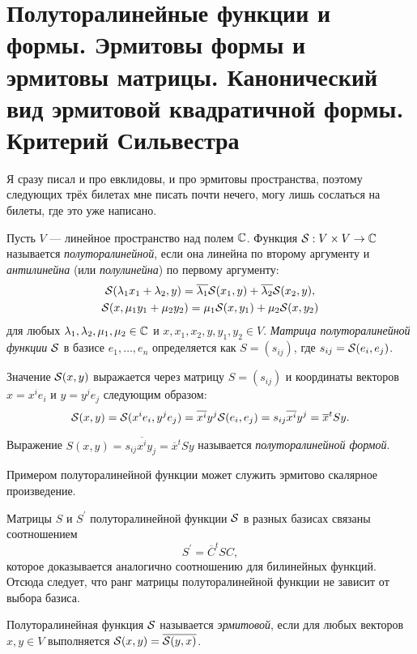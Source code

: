 \section{Полуторалинейные функции и формы. Эрмитовы формы и эрмитовы матрицы.
Канонический вид эрмитовой квадратичной формы. Критерий Сильвестра}

Я сразу писал и про евклидовы, и про эрмитовы пространства, поэтому следующих трёх билетах мне писать почти нечего, могу лишь сослаться на билеты, где это уже написано.

\begin{definition}
    Пусть $V$ --- линейное пространство над полем $\C$. Функция $\S: V \times V \to \C$ называется \textit{полуторалинейной}, если она линейна по второму аргументу и \textit{антилинейна} (или \textit{полулинейна}) по первому аргументу:
    \begin{gather*}
        \S(\lambda_1x_1 + \lambda_2, y) = \overline{\lambda_1}\S(x_1, y) + \overline{\lambda_2}\S(x_2, y),\\
        \S(x, \mu_1y_1 + \mu_2y_2) = \mu_1\S(x, y_1) + \mu_2\S(x, y_2)
    \end{gather*}
    для любых $\lambda_1, \lambda_2, \mu_1, \mu_2 \in \C$ и $x, x_1, x_2, y, y_1, y_2 \in V$. \textit{Матрица полуторалинейной функции $\S$} в базисе $e_1, \ldots, e_n$ определяется как $S = (s_{ij})$, где $s_{ij} = \S(e_i, e_j)$.
\end{definition}

Значение $\S(x, y)$ выражается через матрицу $S = (s_{ij})$ и координаты векторов $x = x^ie_i$ и $y = y^je_j$ следующим образом:
\[
    \S(x, y) = \S(x^ie_i, y^je_j) = \overline{x^i}y^j\S(e_i, e_j) = s_{ij}\overline{x^i}y^j = \overline{x}^tSy.
\]

\begin{definition}
    Выражение $S(x, y) = s_{ij}\overline{x^i}y_j = \overline{x}^tSy$ называется \textit{полуторалинейной формой}.
\end{definition}

Примером полуторалинейной функции может служить эрмитово скалярное произведение.

Матрицы $S$ и $S^\prime$ полуторалинейной функции $\S$ в разных базисах связаны соотношением
\[
    S^\prime = \overline{C}^tSC,
\]
которое доказывается аналогично соотношению для билинейных функций. Отсюда следует, что ранг матрицы полуторалинейной функции не зависит от выбора базиса.

\begin{definition}
    Полуторалинейная функция $\S$ называется \textit{эрмитовой}, если для любых векторов $x, y \in V$ выполняется $\S(x, y) = \overline{\S(y, x)}$.
\end{definition}

